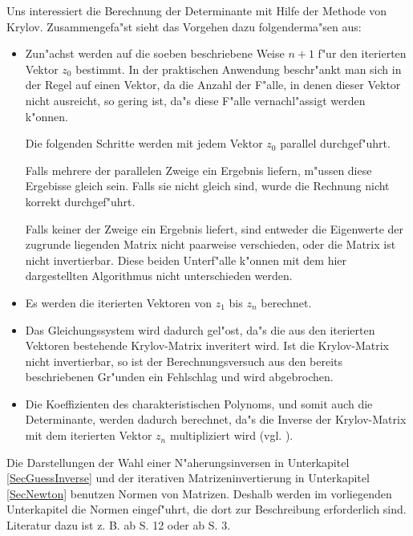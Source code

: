 Uns interessiert die Berechnung der Determinante mit Hilfe der 
Methode von Krylov. Zusammengefa"st sieht das Vorgehen dazu folgenderma"sen
aus:
\begin{itemize}
\item 
      Zun"achst werden auf die soeben beschriebene Weise $n+1$ f"ur den 
      iterierten Vektor $z_0$ bestimmt. In der praktischen Anwendung 
      beschr"ankt man
      sich in der Regel auf einen Vektor, da die Anzahl der F"alle, in 
      denen dieser Vektor nicht ausreicht, so gering ist, da"s diese F"alle
      vernachl"assigt werden k"onnen.

      Die folgenden Schritte werden mit jedem Vektor $z_0$ parallel 
      durchgef"uhrt. 
      
      Falls mehrere der parallelen Zweige ein Ergebnis 
      liefern, m"ussen diese Ergebisse gleich sein. Falls sie nicht 
      gleich sind, wurde die Rechnung nicht korrekt durchgef"uhrt.

      Falls keiner der Zweige ein Ergebnis liefert, sind entweder die 
      Eigenwerte der zugrunde liegenden Matrix nicht paarweise verschieden,
      oder die Matrix ist nicht invertierbar. Diese beiden Unterf"alle 
      k"onnen mit dem hier dargestellten Algorithmus nicht unterschieden 
      werden.
\item 
      Es werden die iterierten Vektoren von $z_1$ bis $z_n$ berechnet.
\item
      Das Gleichungssystem  wird dadurch gel"ost, 
      da"s die aus den iterierten Vektoren bestehende Krylov-Matrix
      inveritert wird. Ist die Krylov-Matrix nicht invertierbar, so ist 
      der Berechnungsversuch aus den bereits beschriebenen Gr"unden
      ein Fehlschlag und wird abgebrochen.
\item
      Die Koeffizienten des charakteristischen Polynoms, und somit auch
      die Determinante, werden dadurch berechnet, da"s die Inverse
      der Krylov-Matrix mit dem iterierten Vektor $z_n$ multipliziert wird
      (vgl. ).
\end{itemize}



\label{SecNorm}

Die Darstellungen der Wahl einer N"aherungsinversen in Unterkapitel 
\ref{SecGuessInverse} und der iterativen Matrizeninvertierung 
in Unterkapitel \ref{SecNewton} benutzen Normen von Matrizen.
Deshalb werden im vorliegenden Unterkapitel die Normen eingef"uhrt, die
dort zur Beschreibung erforderlich sind. 
Literatur dazu ist z. B. \cite{GL83} ab S. 12 
oder \cite{Isaa73} ab S. 3.

